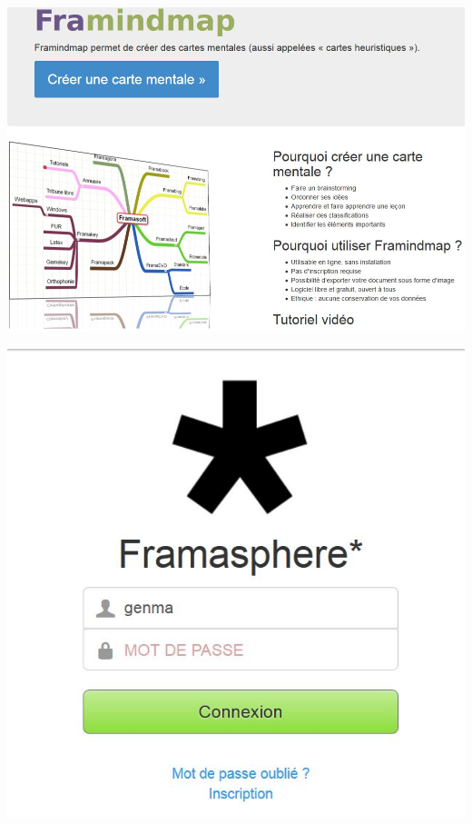 \documentclass{beamer}
\begin{document}
\begin{frame}
\begin{center}
\includegraphics[scale=0.5]{./images/Framindmap.jpg}
\end{center}
\end{frame}

\begin{frame}
\begin{center}
\includegraphics[scale=0.5]{./images/Framasphere.jpg}
\end{center}
\end{frame}
\end{document}
